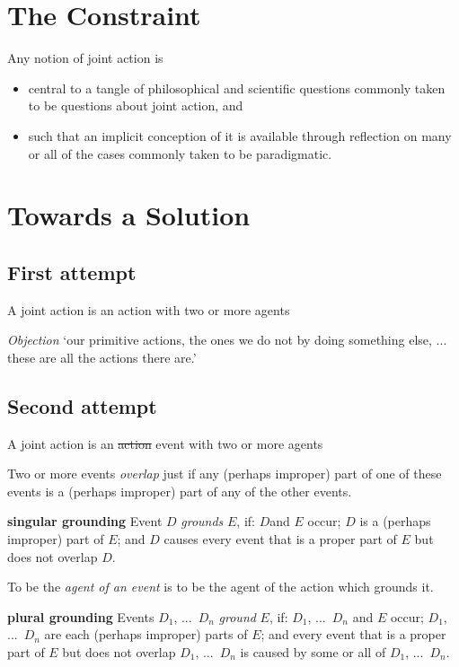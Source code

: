 \documentclass[11pt]{extarticle}
\begin{document}
\begin{multicols}{3}
\section{The Constraint}

Any notion of joint action is 
\begin{itemize}
\item central to a tangle of philosophical and scientific questions  commonly taken to be questions about joint action, and
\item such that an implicit conception of it is available through reflection on many or all of the cases commonly taken to be paradigmatic.
\end{itemize}


\section{Towards a Solution}


\subsection{First attempt} 
A joint action is an action with two or more agents\citep{ludwig_collective_2007}

\emph{Objection} 
`our primitive actions, the ones we do not by doing something else, ... these are all the actions there are.'\citep%
{Davidson:1971fz}


\subsection{Second attempt}
A joint action is an \sout{action} event with two or more agents\citep{ludwig_collective_2007}

Two or more events \emph{overlap} just if any (perhaps improper) part of one of these events is a (perhaps improper) part of any of the other events.

\textbf{singular grounding} 
Event $D$ \emph{grounds} $E$, if: $D$and $E$ occur; 
$D$ is a (perhaps improper) part of $E$; and 
$D$ causes every event that is a proper part of $E$ but does not overlap $D$.

To be the \emph{agent of an event} is to be the agent of the action which grounds it.\citep%
{pietroski_actions_1998}


\textbf{plural grounding} 
Events $D_1$, ...\ $D_n$ \emph{ground} $E$, if: $D_1$, ...\ $D_n$ and $E$ occur; 
$D_1$, ...\ $D_n$ are each (perhaps improper) parts of $E$; and 
every event that is a proper part of $E$ but does not overlap  $D_1$, ...\ $D_n$ is caused by some or all of $D_1$, ...\ $D_n$.


\end{multicols}
\end{document}
